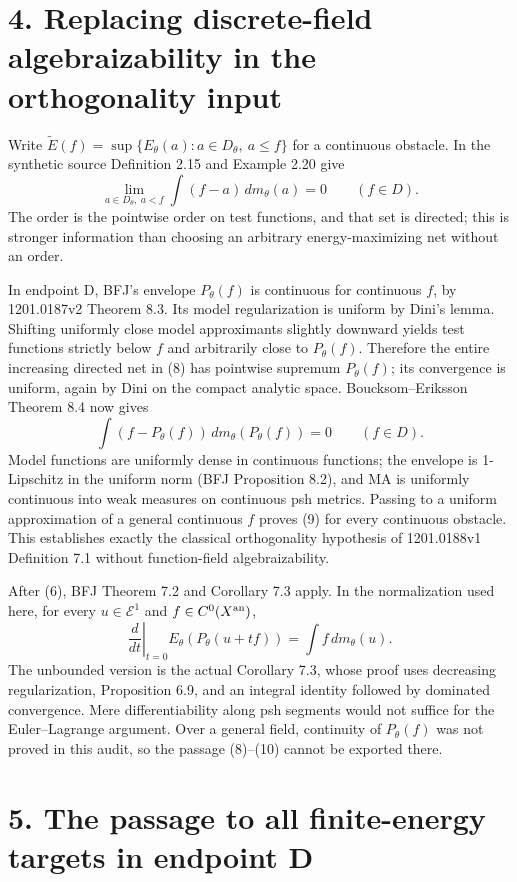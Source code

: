 \documentclass[11pt]{article}
\begin{document}
\section*{4. Replacing discrete-field algebraizability in the orthogonality input}

Write \(\widetilde E(f)=\sup\{E_\theta(a):a\in D_\theta,\ a\leq f\}\) for a continuous obstacle. In the synthetic source Definition 2.15 and Example 2.20 give
\[
 \lim_{a\in D_\theta,\ a<f}\int(f-a)\,dm_\theta(a)=0
 \qquad(f\in D).
 \tag{8}
\]
The order is the pointwise order on test functions, and that set is directed; this is stronger information than choosing an arbitrary energy-maximizing net without an order.

In endpoint D, BFJ's envelope \(P_\theta(f)\) is continuous for continuous \(f\), by 1201.0187v2 Theorem 8.3. Its model regularization is uniform by Dini's lemma. Shifting uniformly close model approximants slightly downward yields test functions strictly below \(f\) and arbitrarily close to \(P_\theta(f)\). Therefore the entire increasing directed net in (8) has pointwise supremum \(P_\theta(f)\); its convergence is uniform, again by Dini on the compact analytic space. Boucksom--Eriksson Theorem 8.4 now gives
\[
 \int(f-P_\theta(f))\,dm_\theta(P_\theta(f))=0
 \qquad(f\in D).
 \tag{9}
\]
Model functions are uniformly dense in continuous functions; the envelope is 1-Lipschitz in the uniform norm (BFJ Proposition 8.2), and MA is uniformly continuous into weak measures on continuous psh metrics. Passing to a uniform approximation of a general continuous \(f\) proves (9) for every continuous obstacle. This establishes exactly the classical orthogonality hypothesis of 1201.0188v1 Definition 7.1 without function-field algebraizability.

After (6), BFJ Theorem 7.2 and Corollary 7.3 apply. In the normalization used here, for every \(u\in\mathcal E^1\) and \(f\in C^0(X^{\rm an})\),
\[
 \left.\frac d{dt}\right|_{t=0}E_\theta(P_\theta(u+tf))
 =\int f\,dm_\theta(u).
 \tag{10}
\]
The unbounded version is the actual Corollary 7.3, whose proof uses decreasing regularization, Proposition 6.9, and an integral identity followed by dominated convergence. Mere differentiability along psh segments would not suffice for the Euler--Lagrange argument. Over a general field, continuity of \(P_\theta(f)\) was not proved in this audit, so the passage (8)--(10) cannot be exported there.

\section*{5. The passage to all finite-energy targets in endpoint D}
\end{document}
